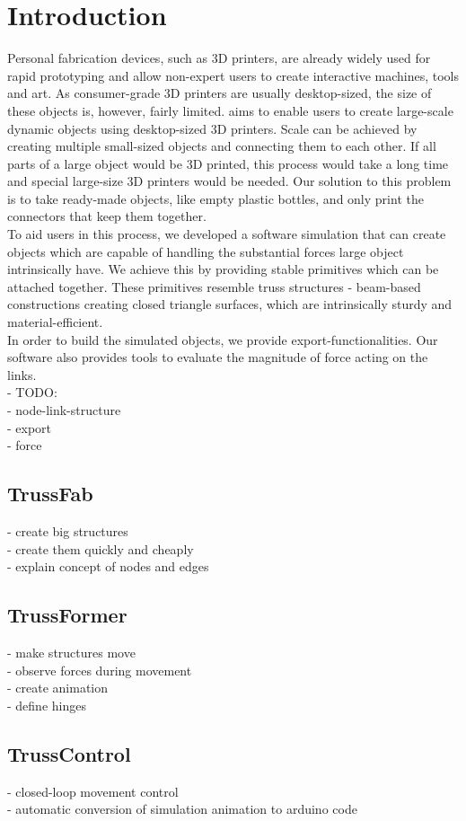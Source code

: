 \chapter{Introduction}\label{ch:introduction}
Personal fabrication devices, such as 3D printers, are already widely used for rapid prototyping and allow non-expert users to create interactive machines, tools and art. As consumer-grade 3D printers are usually desktop-sized, the size of these objects is, however, fairly limited. \trussFabName{} aims to enable users to create large-scale dynamic objects using desktop-sized 3D printers. Scale can be achieved by creating multiple small-sized objects and connecting them to each other. If all parts of a large object would be 3D printed, this process would take a long time and special large-size 3D printers would be needed. Our solution to this problem is to take ready-made objects, like empty plastic bottles, and only print the connectors that keep them together.\\
To aid users in this process, we developed a software simulation that can create objects which are capable of handling the substantial forces large object intrinsically have. We achieve this by providing stable primitives which can be attached together. These primitives resemble truss structures - beam-based constructions creating closed triangle surfaces, which are intrinsically sturdy and material-efficient.\\
In order to build the simulated objects, we provide export-functionalities.
Our software also provides tools to evaluate the magnitude of force acting on the links.\\
- TODO:\\
- node-link-structure\\
- export\\
- force\\
\section{TrussFab}
- create big structures\\
- create them quickly and cheaply\\
- explain concept of nodes and edges\\
\section{TrussFormer}
- make structures move\\
- observe forces during movement\\
- create animation\\
- define hinges\\
\section{TrussControl}
- closed-loop movement control\\
- automatic conversion of simulation animation to arduino code\\
